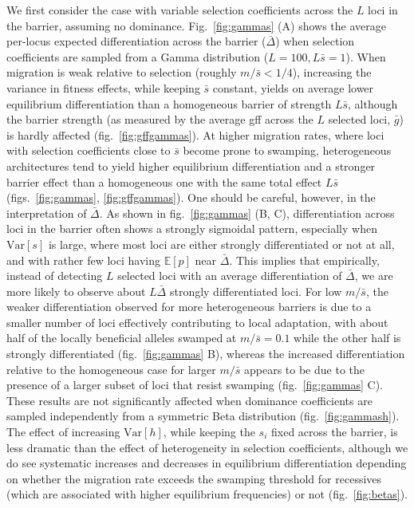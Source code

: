 \documentclass[
  11pt,
]{article}
\begin{document}
We first consider the case with variable selection coefficients across
the \(L\) loci in the barrier, assuming no dominance.
Fig.~\ref{fig:gammas} (A) shows the average per-locus expected
differentiation across the barrier (\(\bar{\Delta}\)) when selection
coefficients are sampled from a Gamma distribution
(\(L=100, L\bar{s}=1\)). When migration is weak relative to selection
(roughly \(m/\bar{s} < 1/4\)), increasing the variance in fitness
effects, while keeping \(\bar{s}\) constant, yields on average lower
equilibrium differentiation than a homogeneous barrier of strength
\(L\bar{s}\), although the barrier strength (as measured by the average
gff across the \(L\) selected loci, \(\bar{g}\)) is hardly affected
(fig.~\ref{fig:gffgammas}). At higher migration rates, where loci with
selection coefficients close to \(\bar{s}\) become prone to swamping,
heterogeneous architectures tend to yield higher equilibrium
differentiation and a stronger barrier effect than a homogeneous one
with the same total effect \(L\bar{s}\)
(figs.~\ref{fig:gammas}, \ref{fig:gffgammas}). One should be careful,
however, in the interpretation of \(\bar{\Delta}\). As shown in
fig.~\ref{fig:gammas} (B, C), differentiation across loci in the barrier
often shows a strongly sigmoidal pattern, especially when
\(\mathrm{Var}[s]\) is large, where most loci are either strongly
differentiated or not at all, and with rather few loci having
\(\mathbb{E}[p]\) near \(\bar{\Delta}\). This implies that empirically,
instead of detecting \(L\) selected loci with an average differentiation
of \(\bar{\Delta}\), we are more likely to observe about
\(L\bar{\Delta}\) strongly differentiated loci. For low \(m/\bar{s}\),
the weaker differentiation observed for more heterogeneous barriers is
due to a smaller number of loci effectively contributing to local
adaptation, with about half of the locally beneficial alleles swamped at
\(m/\bar{s}=0.1\) while the other half is strongly differentiated
(fig.~\ref{fig:gammas} B), whereas the increased differentiation
relative to the homogeneous case for larger \(m/\bar{s}\) appears to be
due to the presence of a larger subset of loci that resist swamping
(fig.~\ref{fig:gammas} C). These results are not significantly affected
when dominance coefficients are sampled independently from a symmetric
Beta distribution (fig.~\ref{fig:gammash}). The effect of increasing
\(\mathrm{Var}[h]\), while keeping the \(s_i\) fixed across the barrier,
is less dramatic than the effect of heterogeneity in selection
coefficients, although we do see systematic increases and decreases in
equilibrium differentiation depending on whether the migration rate
exceeds the swamping threshold for recessives (which are associated with
higher equilibrium frequencies) or not (fig.~\ref{fig:betas}).
\end{document}

